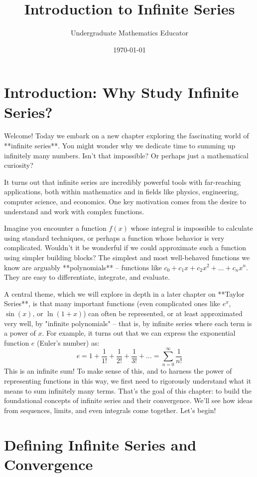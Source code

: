 \documentclass[11pt]{article}
\title{Introduction to Infinite Series}
\author{Undergraduate Mathematics Educator} %
\date{\today}
\theoremstyle{definition}
\theoremstyle{remark}
\begin{document}
\maketitle

\section{Introduction: Why Study Infinite Series?}

Welcome! Today we embark on a new chapter exploring the fascinating world of **infinite series**. You might wonder why we dedicate time to summing up infinitely many numbers. Isn't that impossible? Or perhaps just a mathematical curiosity?

It turns out that infinite series are incredibly powerful tools with far-reaching applications, both within mathematics and in fields like physics, engineering, computer science, and economics. One key motivation comes from the desire to understand and work with complex functions.

Imagine you encounter a function $f(x)$ whose integral is impossible to calculate using standard techniques, or perhaps a function whose behavior is very complicated. Wouldn't it be wonderful if we could approximate such a function using simpler building blocks? The simplest and most well-behaved functions we know are arguably **polynomials** – functions like $c_0 + c_1 x + c_2 x^2 + \dots + c_n x^n$. They are easy to differentiate, integrate, and evaluate.

A central theme, which we will explore in depth in a later chapter on **Taylor Series**, is that many important functions (even complicated ones like $e^x$, $\sin(x)$, or $\ln(1+x)$) can often be represented, or at least approximated very well, by "infinite polynomials" – that is, by infinite series where each term is a power of $x$. For example, it turns out that we can express the exponential function $e$ (Euler's number) as:
\[ e = 1 + \frac{1}{1!} + \frac{1}{2!} + \frac{1}{3!} + \dots = \sum_{n=0}^{\infty} \frac{1}{n!} \]
This is an infinite sum! To make sense of this, and to harness the power of representing functions in this way, we first need to rigorously understand what it means to sum infinitely many terms. That's the goal of this chapter: to build the foundational concepts of infinite series and their convergence. We'll see how ideas from sequences, limits, and even integrals come together. Let's begin!

\section{Defining Infinite Series and Convergence}
\end{document}
